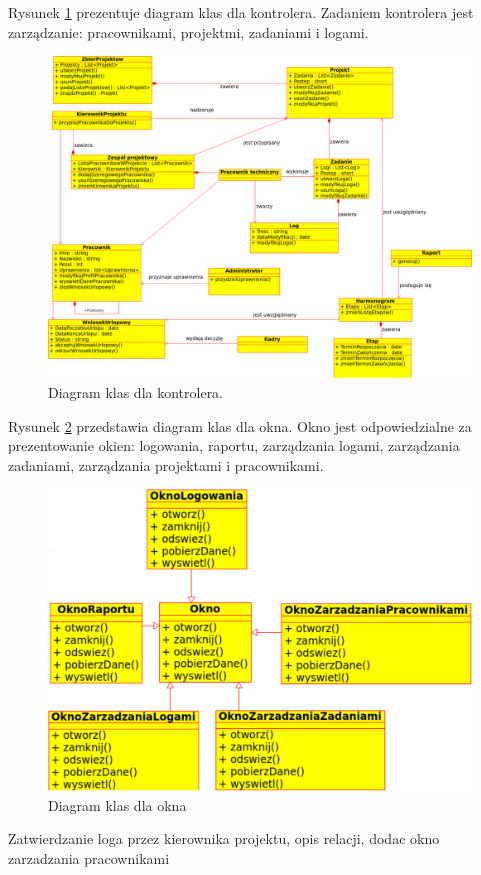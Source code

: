Rysunek \ref{fig:KontrolerDiagramKlas} prezentuje diagram klas dla kontrolera. Zadaniem kontrolera jest zarządzanie: pracownikami, projektmi, zadaniami i logami.

\begin{figure}[h]
    \centering
    \includegraphics[scale=0.4]{diagramy/modelKlas/KontrolerDiagramKlas}
    \caption{Diagram klas dla kontrolera.}
    \label{fig:KontrolerDiagramKlas}
\end{figure}

Rysunek \ref{fig:OknoDiagramKlas} przedstawia diagram klas dla okna. 
Okno jest odpowiedzialne za prezentowanie okien: logowania, raportu, zarządzania logami, zarządzania zadaniami, zarządzania projektami i pracownikami.


\begin{figure}[h]
    \centering
    \includegraphics[scale=0.7]{diagramy/modelKlas/OknoDiagramKlas}
    \caption{Diagram klas dla okna}
    \label{fig:OknoDiagramKlas}
\end{figure}

Zatwierdzanie loga przez kierownika projektu, opis relacji, dodac okno zarzadzania pracownikami
